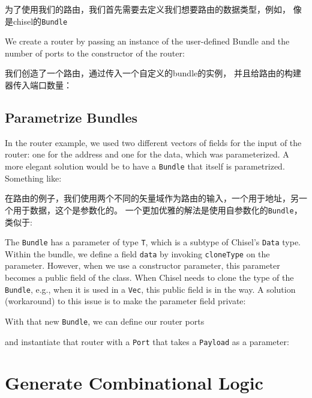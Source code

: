 \documentclass[%
    10pt,
    headinclude, footexclude,
    openright, %
    notitlepage,
    cleardoubleempty,
    headsepline,
    pointlessnumbers,
    bibtotoc, idxtotoc,
    ]{scrbook}
\newcommand{\code}[1]{{\small{\texttt{#1}}}}
\begin{document}
{\noindent 为了使用我们的路由，我们首先需要去定义我们想要路由的数据类型，例如，
像是chisel的\code{Bundle}


\noindent We create a router by passing an instance of the user-defined Bundle and
the number of ports to the constructor of the router:

\noindent 我们创造了一个路由，通过传入一个自定义的bundle的实例，
并且给路由的构建器传入端口数量：



\subsection{Parametrize Bundles}

In the router example, we used two different vectors of fields for the input
of the router: one for the address and one for the data, which was parameterized.
A more elegant solution would be to have a \code{Bundle} that itself
is parametrized. Something like:

在路由的例子，我们使用两个不同的矢量域作为路由的输入，一个用于地址，另一个用于数据，这个是参数化的。
一个更加优雅的解法是使用自参数化的\code{Bundle}，类似于:


The \code{Bundle} has a parameter of type \code{T}, which is a subtype
of Chisel's \code{Data} type.
Within the bundle, we define a field \code{data} by invoking \code{cloneType}
on the parameter.
However, when we use a constructor parameter, this parameter becomes a
public field of the class. When Chisel needs to clone the type of the \code{Bundle},
e.g., when it is used in a \code{Vec}, this public field is in the way.
A solution (workaround) to this issue is to make the parameter field private:




\noindent With that new \code{Bundle}, we can define our router ports


\noindent and instantiate that router with a \code{Port} that takes
a \code{Payload} as a parameter:



\section{Generate Combinational Logic}

}
\end{document}
